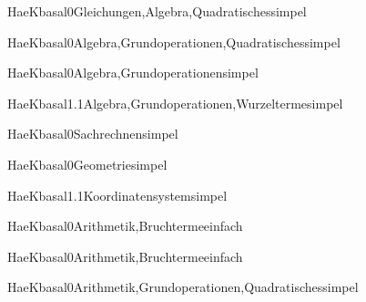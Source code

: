 \documentclass[12pt]{article}
\begin{document}
\begin{Add}{HaeK}{basal0}{Gleichungen,Algebra,Quadratisches}{simpel}
      
\end{Add}

\begin{Add}{HaeK}{basal0}{Algebra,Grundoperationen,Quadratisches}{simpel}
\end{Add}

\begin{Add}{HaeK}{basal0}{Algebra,Grundoperationen}{simpel}
\end{Add}

\begin{Add}{HaeK}{basal1.1}{Algebra,Grundoperationen,Wurzelterme}{simpel}
\end{Add}

\begin{Add}{HaeK}{basal0}{Sachrechnen}{simpel}
\end{Add}

\begin{Add}{HaeK}{basal0}{Geometrie}{simpel}
\end{Add}

\begin{Add}{HaeK}{basal1.1}{Koordinatensystem}{simpel}
\end{Add}

\begin{Add}{HaeK}{basal0}{Arithmetik,Bruchterme}{einfach}
\end{Add}

\begin{Add}{HaeK}{basal0}{Arithmetik,Bruchterme}{einfach}
\end{Add}

\begin{Add}{HaeK}{basal0}{Arithmetik,Grundoperationen,Quadratisches}{simpel}
\end{Add}
\end{document}
